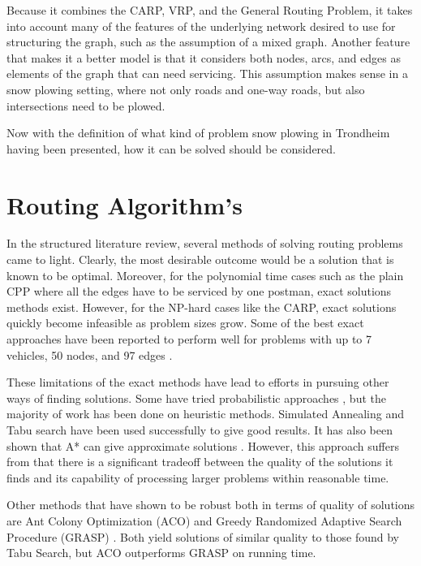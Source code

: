 Because it combines the CARP, VRP, and the General Routing Problem, it takes into account many of the features of the underlying network desired to use for structuring the graph, such as the assumption of a mixed graph. Another feature that makes it a better model is that it considers both nodes, arcs, and edges as elements of the graph that can need servicing. This assumption makes sense in a snow plowing setting, where not only roads and one-way roads, but also intersections need to be plowed.

Now with the definition of what kind of problem snow plowing in Trondheim having been presented, how it can be solved should be considered.


\section{Routing Algorithm's} %
\label{sec:routing_algorithms}

In the structured literature review, several methods of solving routing problems came to light. Clearly, the most desirable outcome would be a solution that is known to be optimal. Moreover, for the polynomial time cases such as the plain CPP where all the edges have to be serviced by one postman, exact solutions methods exist. However, for the NP-hard cases like the CARP, exact solutions quickly become infeasible as problem sizes grow. Some of the best exact approaches have been reported to perform well for problems with up to 7 vehicles, 50 nodes, and 97 edges \citep{belenguer2003cutting}.

These limitations of the exact methods have lead to efforts in pursuing other ways of finding solutions. Some have tried probabilistic approaches \citep{christiansen2009branch}, but the majority of work has been done on heuristic methods. Simulated Annealing \citep{eglese1994simulatedAnnealing} and Tabu search \citep{brandao2008tabu} have been used successfully to give good results. It has also been shown that A* can give approximate solutions \citep{rao2011AStar}. However, this approach suffers from that there is a significant tradeoff between the quality of the solutions it finds and its capability of processing larger problems within reasonable time.

Other methods that have shown to be robust both in terms of quality of solutions are Ant Colony Optimization (ACO) \citep{santos2010ACO} and Greedy Randomized Adaptive Search Procedure (GRASP) \citep{usberti2013grasp}. Both yield solutions of similar quality to those found by Tabu Search, but ACO outperforms GRASP on running time.

